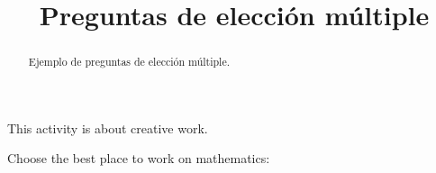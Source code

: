 \documentclass{ximera}
\title{Preguntas de elección múltiple}
\begin{document}
  
\begin{abstract}  
	Ejemplo de preguntas de elección múltiple.
\end{abstract}  
\maketitle  

This activity is about creative work.  
\begin{exercise}  
  Choose the best place to work on mathematics:
  \begin{multipleChoice}  
  \end{multipleChoice}  
\end{exercise}  
\end{document}
